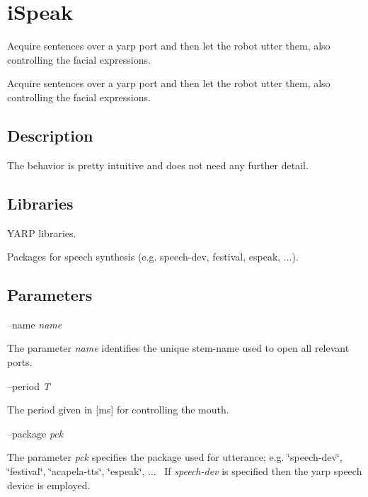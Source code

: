 \section{i\+Speak}
\label{group__iSpeak}


Acquire sentences over a yarp port and then let the robot utter them, also controlling the facial expressions.  


Acquire sentences over a yarp port and then let the robot utter them, also controlling the facial expressions. 

\hypertarget{group__windows-tts_intro_sec}{}\subsection{Description}\label{group__windows-tts_intro_sec}
The behavior is pretty intuitive and does not need any further detail.~\newline
 \hypertarget{group__windows-tts_lib_sec}{}\subsection{Libraries}\label{group__windows-tts_lib_sec}

\begin{DoxyItemize}
\item Y\+A\+RP libraries.
\item Packages for speech synthesis (e.\+g. speech-\/dev, festival, espeak, ...).
\end{DoxyItemize}\hypertarget{group__windows-tts_parameters_sec}{}\subsection{Parameters}\label{group__windows-tts_parameters_sec}
--name {\itshape name} 
\begin{DoxyItemize}
\item The parameter {\itshape name} identifies the unique stem-\/name used to open all relevant ports.
\end{DoxyItemize}

--period {\itshape T} 
\begin{DoxyItemize}
\item The period given in \mbox{[}ms\mbox{]} for controlling the mouth.
\end{DoxyItemize}

--package {\itshape pck} 
\begin{DoxyItemize}
\item The parameter {\itshape pck} specifies the package used for utterance; e.\+g. \char`\"{}speech-\/dev\char`\"{}, \char`\"{}festival\char`\"{}, \char`\"{}acapela-\/tts\char`\"{}, \char`\"{}espeak\char`\"{}, ...~\newline
 If {\itshape speech-\/dev} is specified then the yarp speech device is employed.
\end{DoxyItemize}

